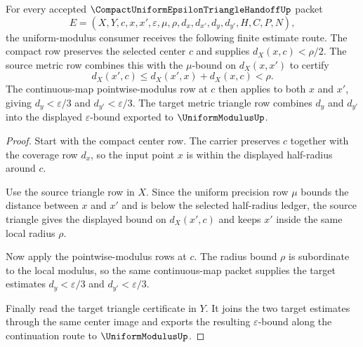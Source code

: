 \begin{theorem}
\label{thm:compact-uniform-epsilon-triangle-handoff-estimate}
For every accepted $\CompactUniformEpsilonTriangleHandoffUp$ packet
$$
E=(X,Y,c,x,x',\varepsilon,\mu,\rho,d_x,d_{x'},d_y,d_{y'},H,C,P,N),
$$
the uniform-modulus consumer receives the following finite estimate route. The compact row preserves the selected center $c$ and supplies $d_X(x,c)<\rho/2$. The source metric row combines this with the $\mu$-bound on $d_X(x,x')$ to certify
$$
d_X(x',c) \le d_X(x',x)+d_X(x,c)<\rho.
$$
The continuous-map pointwise-modulus row at $c$ then applies to both $x$ and $x'$, giving $d_y<\varepsilon/3$ and $d_{y'}<\varepsilon/3$. The target metric triangle row combines $d_y$ and $d_{y'}$ into the displayed $\varepsilon$-bound exported to $\UniformModulusUp$.
\end{theorem}
\begin{proof}
Start with the compact center row. The carrier preserves $c$ together with the coverage row $d_x$, so the input point $x$ is within the displayed half-radius around $c$.

Use the source triangle row in $X$. Since the uniform precision row $\mu$ bounds the distance between $x$ and $x'$ and is below the selected half-radius ledger, the source triangle gives the displayed bound on $d_X(x',c)$ and keeps $x'$ inside the same local radius $\rho$.

Now apply the pointwise-modulus rows at $c$. The radius bound $\rho$ is subordinate to the local modulus, so the same continuous-map packet supplies the target estimates $d_y<\varepsilon/3$ and $d_{y'}<\varepsilon/3$.

Finally read the target triangle certificate in $Y$. It joins the two target estimates through the same center image and exports the resulting $\varepsilon$-bound along the continuation route to $\UniformModulusUp$.
\end{proof}



